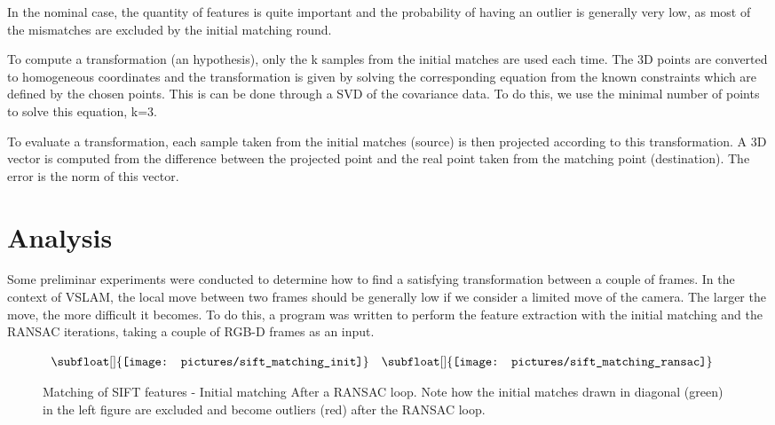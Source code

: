 In the nominal case, the quantity of features is quite important and the probability of having an outlier is generally very low, as most of the mismatches are excluded by the initial matching round.


To compute a transformation (an hypothesis), only the k samples from the initial matches are used each time. The 3D points are converted to homogeneous coordinates and the transformation is given by solving the corresponding equation from the known constraints which are defined by the chosen points. This is can be done through a \gls{SVD} of the covariance data. To do this, we use the minimal number of points to solve this equation, k=3.

To evaluate a transformation, each sample taken from the initial matches (source) is then projected according to this transformation. A 3D vector is computed from the difference between the projected point and the real point taken from the matching point (destination). The error is the norm of this vector.

\section{Analysis}

Some preliminar experiments were conducted to determine how to find a satisfying transformation between a couple of frames. In the context of \gls{VSLAM}, the local move between two frames should be generally low if we consider a limited move of the camera. The larger the move, the more difficult it becomes. To do this, a program was written to perform the feature extraction with the initial matching and the RANSAC iterations, taking a couple of RGB-D frames as an input.

\begin{figure}[H]
\centering$
 \begin{array}{cc}
 \subfloat[]{\label{fig:sift_match_1} \texttt{[image: pictures/sift\_matching\_init]}} &
 \subfloat[]{\label{fig:sift_match_2} \texttt{[image: pictures/sift\_matching\_ransac]}}
 \end{array}$
\caption{Matching of SIFT features - \protect{} Initial matching \protect{} After a RANSAC loop. Note how the initial matches drawn in diagonal (green) in the left figure are excluded and become outliers (red) after the RANSAC loop.}
\end{figure}

